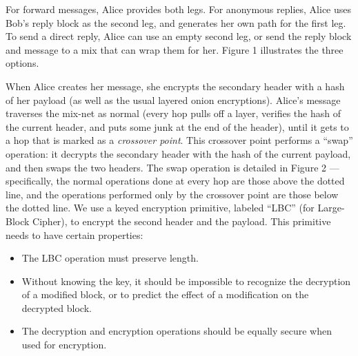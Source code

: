 \documentclass[final]{ieee}
\begin{document}
For forward messages, Alice provides both legs. For anonymous replies, Alice
uses Bob's reply block as the second leg, and generates her own path
for the first leg.  To send a direct reply, Alice can use an empty
second leg, or send the reply block and message to a mix that can wrap
them for her. Figure 1 illustrates the three options.

When Alice creates her message, she encrypts the secondary header with a hash
of her payload (as well as the usual layered onion encryptions). Alice's
message traverses the mix-net as normal (every hop pulls off a layer,
verifies the hash of the current header, and puts some junk at the end of the
header), until it gets to a hop that is marked as a \emph{crossover
  point}. This crossover point performs a ``swap'' operation: it decrypts the
secondary header with the hash of the current payload, and then swaps the two
headers. The swap operation is detailed in Figure 2 --- specifically, the
normal operations done at every hop are those above the dotted line, and the
operations performed only by the crossover point are those below the dotted
line.  We use a keyed encryption primitive, labeled ``LBC'' (for Large-Block
Cipher), to encrypt the second header and the payload.  This primitive needs
to have certain properties:

\begin{itemize}
\item The LBC operation must preserve length.
\item Without knowing the key, it should be impossible to recognize the
   decryption of a modified block, or to predict the effect of a modification
   on the decrypted block.
\item The decryption and encryption operations should be equally secure when
  used for encryption.
\end{itemize}
\end{document}

